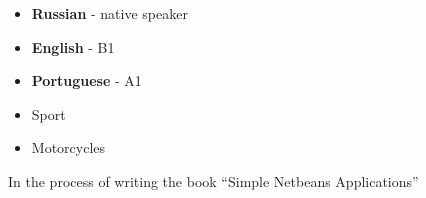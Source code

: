 

\begin{minipage}[t]{0.25\textwidth}
    \vspace{-\baselineskip} %

	\begin{itemize}[leftmargin=.2in]
	\setlength\itemsep{0em}
    	\item \textbf{Russian} - native speaker
    	\item \textbf{English} - B1
    	\item \textbf{Portuguese} - A1
    \end{itemize}

\end{minipage}
\hfill
\begin{minipage}[t]{0.15\textwidth}
    \vspace{-\baselineskip} %

	\begin{itemize}[leftmargin=.2in]
		\setlength\itemsep{0em}
	    \item Sport
	    \item Motorcycles
	\end{itemize}

\end{minipage}
\hfill
\begin{minipage}[t]{0.5\textwidth}
    \vspace{-\baselineskip} %


    In the process of writing the book \enquote{Simple Netbeans Applications}
\end{minipage}

\vspace{0.5cm}

